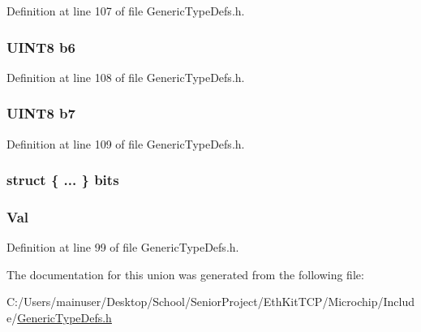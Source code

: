 Definition at line 107 of file Generic\+Type\+Defs.\+h.

\hypertarget{union_u_i_n_t8___v_a_l_a6e2f92e230bd0de99eaf629e3773e0f3}{}
\subsubsection[{b6}]{ {\bf U\+I\+N\+T8} b6}\label{union_u_i_n_t8___v_a_l_a6e2f92e230bd0de99eaf629e3773e0f3}


Definition at line 108 of file Generic\+Type\+Defs.\+h.

\hypertarget{union_u_i_n_t8___v_a_l_a3ebca743ae92e60d1aee4011d025bd2a}{}
\subsubsection[{b7}]{ {\bf U\+I\+N\+T8} b7}\label{union_u_i_n_t8___v_a_l_a3ebca743ae92e60d1aee4011d025bd2a}


Definition at line 109 of file Generic\+Type\+Defs.\+h.

\hypertarget{union_u_i_n_t8___v_a_l_a7c38ea03f26603d6b2be5fced0ea3af0}{}
\subsubsection[{bits}]{\setlength{\rightskip}{0pt plus 5cm}struct \{ ... \}   bits}\label{union_u_i_n_t8___v_a_l_a7c38ea03f26603d6b2be5fced0ea3af0}
\hypertarget{union_u_i_n_t8___v_a_l_a8771f77e61c81831be1a68e6dc5684bb}{}
\subsubsection[{Val}]{ Val}\label{union_u_i_n_t8___v_a_l_a8771f77e61c81831be1a68e6dc5684bb}


Definition at line 99 of file Generic\+Type\+Defs.\+h.



The documentation for this union was generated from the following file\+:\begin{DoxyCompactItemize}
\item 
C\+:/\+Users/mainuser/\+Desktop/\+School/\+Senior\+Project/\+Eth\+Kit\+T\+C\+P/\+Microchip/\+Include/\hyperlink{_generic_type_defs_8h}{Generic\+Type\+Defs.\+h}\end{DoxyCompactItemize}
